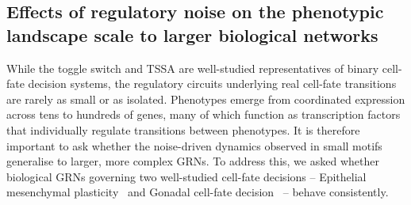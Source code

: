 \documentclass[11pt]{article}
\begin{document}


\subsection{Effects of regulatory noise on the phenotypic landscape scale to larger biological networks}

While the toggle switch and TSSA are well-studied representatives of binary cell-fate decision systems, the regulatory circuits underlying real cell-fate transitions are rarely as small or as isolated. Phenotypes emerge from coordinated expression across tens to hundreds of genes, many of which function as transcription factors that individually regulate transitions between phenotypes. It is therefore important to ask whether the noise-driven dynamics observed in small motifs generalise to larger, more complex GRNs. To address this, we asked whether biological GRNs governing two well-studied cell-fate decisions -- Epithelial mesenchymal plasticity~\cite{hari2022landscape} and Gonadal cell-fate decision~\cite{rios2015boolean} -- behave consistently.
\end{document}

